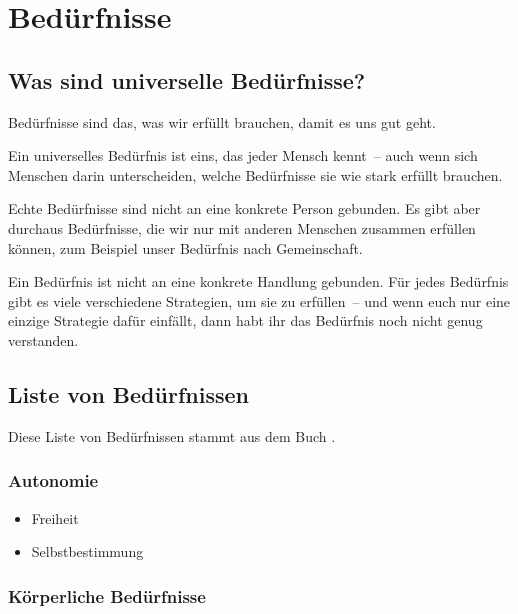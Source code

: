 \section{Bedürfnisse}
\label{beduerfnisse}

\subsection{Was sind universelle Bedürfnisse?}

Bedürfnisse sind das, was wir erfüllt brauchen, damit es uns gut geht.

Ein universelles Bedürfnis ist eins, das jeder Mensch kennt~-- auch wenn sich Menschen darin unterscheiden, welche Bedürfnisse sie wie stark erfüllt brauchen.

Echte Bedürfnisse sind nicht an eine konkrete Person gebunden. Es gibt aber durchaus Bedürfnisse, die wir nur mit anderen Menschen zusammen erfüllen können, zum Beispiel unser Bedürfnis nach Gemeinschaft.

Ein Bedürfnis ist nicht an eine konkrete Handlung gebunden. Für jedes Bedürfnis gibt es viele verschiedene Strategien, um sie zu erfüllen~-- und wenn euch nur eine einzige Strategie dafür einfällt, dann habt ihr das Bedürfnis noch nicht genug verstanden.

\subsection{Liste von Bedürfnissen}

Diese Liste von Bedürfnissen stammt aus dem Buch \cite[S. 75f]{gfk-dummies}.

\subsubsection{Autonomie}

\begin{multicols}{2}
  \begin{itemize}
    \item Freiheit
    \item Selbstbestimmung
  \end{itemize}
\end{multicols}


\subsubsection{Körperliche Bedürfnisse}

